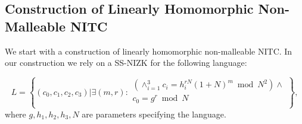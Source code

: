 \subsection{Construction of Linearly Homomorphic Non-Malleable NITC}
\label{sec:linearNITCstdmodel}
We start with a construction of linearly homomorphic non-malleable NITC. In our construction we rely on a SS-NIZK for the following language: 

\[
L = \left\{(c_0, c_1, c_2, c_3)| \exists (m,r):
\begin{aligned}
       (\land_{i=1}^3 c_i = h_i^{rN}(1+N)^m \bmod N^2) \land \\
       c_0 = g^r \bmod N\\
    \end{aligned}
    \right\}, 
\]
where $g, h_1, h_2, h_3, N$ are parameters specifying the language.



